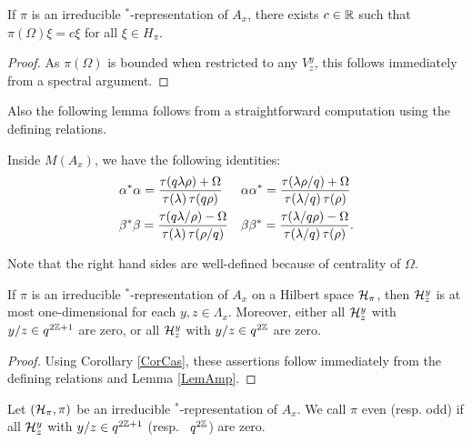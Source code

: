 \begin{Cor}\label{CorCas} If $\pi$ is an irreducible $^*$-representation of $A_x$, there exists $c\in \mathbb{R}$ such that $\pi(\Omega)\xi = c\xi$ for all $\xi \in H_{\pi}$. 
\end{Cor} 
\begin{proof} As $\pi(\Omega)$ is bounded when restricted to any $V^y_z$, this follows immediately from a spectral argument. 
\end{proof} 

Also the following lemma follows from a straightforward computation using the defining relations.

\begin{Lem}\label{LemAmp} Inside $M(A_x)$, we have the following identities:
\begin{align*}
&\alpha^*\alpha = \frac{\operatorname{\tau}(q\lambda\rho)+\Omega}{\operatorname{\tau}(\lambda)\operatorname{\tau}(q\rho)} && \alpha\alpha^* = \frac{\operatorname{\tau}(\lambda\rho/q)+\Omega}{\operatorname{\tau}(\lambda/q)\operatorname{\tau}(\rho)}\\ 
&\beta^*\beta = \frac{\operatorname{\tau}(q\lambda/\rho)-\Omega}{\operatorname{\tau}(\lambda)\operatorname{\tau}(\rho/q)}&& \beta\beta^* = \frac{\operatorname{\tau}(\lambda/q\rho)-\Omega}{\operatorname{\tau}(\lambda/q)\operatorname{\tau}(\rho)}.
\end{align*}
\end{Lem}

Note that the right hand sides are well-defined because of centrality of $\Omega$.

\begin{Cor}\label{CorOneDim} If $\pi$ is an irreducible $^*$-representation of $A_x$ on a Hilbert space $\mathcal{H}_{\pi}$, then $\mathcal{H}^y_z$ is at most one-dimensional for each $y,z\in \Lambda_x$. Moreover, either all $\mathcal{H}^y_z$ with $y/z\in q^{2\mathbb{Z}+1}$ are zero, or all $\mathcal{H}^y_z$ with $y/z\in q^{2\mathbb{Z}}$ are zero. 
\end{Cor} 
\begin{proof} 
Using Corollary \ref{CorCas}, these assertions follow immediately from the defining relations and Lemma \ref{LemAmp}.
\end{proof}

\begin{Def} Let $(\mathcal{H}_{\pi},\pi)$ be an irreducible $^*$-representation of $A_x$. We call $\pi$ even (resp. odd) if all $\mathcal{H}^y_z$ with $y/z \in q^{2\mathbb{Z}+1}$ (resp.~ $q^{2\mathbb{Z}}$) are zero.
\end{Def} 


